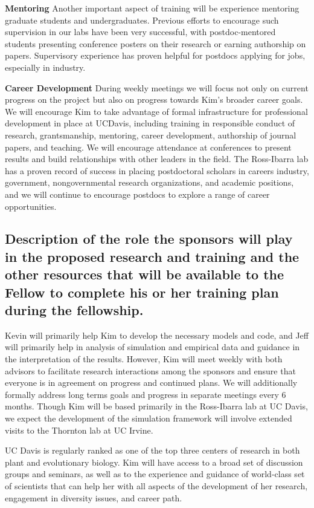 \textbf{Mentoring}
Another important aspect of training will be experience mentoring graduate students and undergraduates.  Previous efforts to encourage such supervision in our labs have been very successful, with postdoc-mentored students presenting conference posters on their research or earning authorship on papers.  Supervisory experience has proven helpful for postdocs applying for jobs, especially in industry.

\textbf{Career Development}
During weekly  meetings we will focus not only on current progress on the project but also on progress  towards Kim's broader career goals. We will encourage Kim to take advantage of formal infrastructure for professional development in place at UCDavis, including training in responsible conduct of research, grantsmanship, mentoring, career development, authorship of journal papers, and teaching. We will encourage attendance at conferences to present results and build relationships with other leaders in the field. The Ross-Ibarra lab has a proven record of success in placing postdoctoral scholars in careers industry, government, nongovernmental research organizations, and academic positions, and we will continue to encourage postdocs to explore a range of career opportunities.

\subsection{Description of the role the sponsors will play in the proposed research and training and the other resources that will be available to the Fellow to complete his or her training plan during the fellowship.}


Kevin will primarily help Kim to develop the necessary models and code, and Jeff will primarily help in analysis of simulation and empirical data and guidance in the interpretation of the results. 
However, Kim will meet weekly with both advisors to facilitate research interactions among the sponsors and ensure that everyone is in agreement on progress and continued plans.   We will additionally formally address long terms goals and progress in separate meetings every 6 months. Though Kim will be based primarily in the Ross-Ibarra lab at UC Davis, we expect the development of the simulation framework will involve extended visits to the Thornton lab at UC Irvine.

UC Davis is regularly ranked as one of the top three centers of research in both plant and evolutionary biology.  Kim will have access to a broad set of discussion groups and seminars, as well as to the experience and guidance of world-class set of scientists that can help her with all aspects of the development of her research, engagement in diversity issues, and career path.

